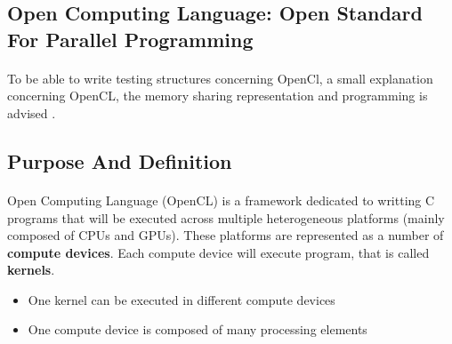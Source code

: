 \documentclass{article}
\begin{document}
\begin{itemize}
\begin{comment}
    virtual bool runOnFunction(Function &F) 
    {
    LoopInfo &LI = getAnalysis<LoopInfo>();
    errs() << "Function " << F.getName() + "\n";
    for (LoopInfo::iterator i = LI.begin(), e = LI.end();
    i != e; ++i)
        countBlocksInLoop(*i, 0);
    return(false);
}
\end{lstlisting}

\paragraph{}
As we can see in the code, in the runOnFunction, we run the LoopInfo pass, get the generated analysis thanks to getAnalysis and then on each loop of the result, run the countBlocksInLoop pass.
\end{comment}


\section{Open Computing Language: Open Standard For Parallel Programming}

\paragraph{}
To be able to write testing structures concerning OpenCl, a small explanation concerning OpenCL, the memory sharing representation and programming is advised \cite{stoneopencl}.


\subsection{Purpose And Definition}

\paragraph{}
Open Computing Language (OpenCL) is a framework dedicated to writting C programs that will be executed across multiple heterogeneous platforms (mainly composed of CPUs and GPUs). These platforms are represented as a number of \textbf{compute devices}. Each compute device will execute program, that is called \textbf{kernels}.
\begin{itemize}
\item One kernel can be executed in different compute devices
\item One compute device is composed of many processing elements
\end{itemize}


\end{itemize}
\end{document}
